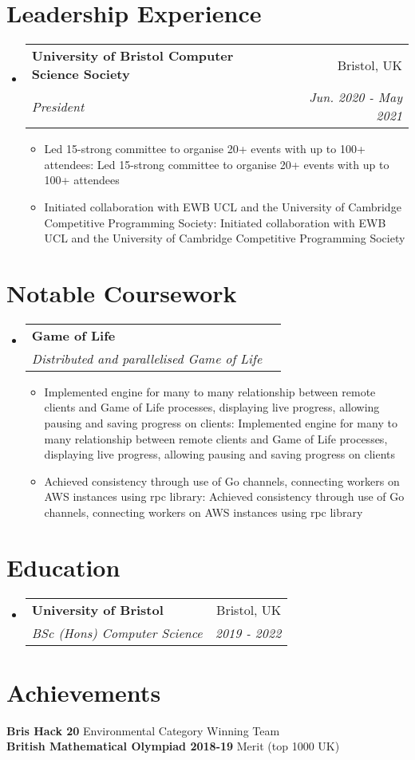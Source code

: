 \documentclass[a4paper,11pt]{article}
\makeatletter
\def \ifempty#1{\def\temp{#1} \ifx\temp\empty }
\newcommand{\resumeItem}[2]{
  \item\small{
  	\ifempty{#1}#2\else\textbf{#1}{: #2 \vspace{-2pt}}\fi
  }
}
\newcommand{\resumeSubheading}[4]{
  \vspace{-1pt}\item
    \begin{tabular*}{0.97\textwidth}{l@{\extracolsep{\fill}}r}
      \textbf{#1} & #2 \\
      \textit{\small#3} & \textit{\small #4} \\
    \end{tabular*}\vspace{-5pt}
}
\newcommand{\resumeSubHeadingListStart}{\begin{itemize}[leftmargin=*]}
\newcommand{\resumeSubHeadingListEnd}{\end{itemize}}
\newcommand{\resumeItemListStart}{\begin{itemize}}
\newcommand{\resumeItemListEnd}{\end{itemize}\vspace{-5pt}}
\makeatother
\begin{document}
\section{Leadership Experience}
  \resumeSubHeadingListStart
    \resumeSubheading
      {University of Bristol Computer Science Society}{Bristol, UK}
      {President}{Jun. 2020 - May 2021}
      \resumeItemListStart
        \resumeItem{}
          {Led 15-strong committee to organise 20+ events with up to 100+ attendees}
        \resumeItem{}
          {Initiated collaboration with EWB UCL and the University of Cambridge Competitive Programming Society}
      \resumeItemListEnd
  \resumeSubHeadingListEnd


\section{Notable Coursework}
  \resumeSubHeadingListStart
    \resumeSubheading
      {Game of Life}{}
      {Distributed and parallelised Game of Life}{}
      \resumeItemListStart
        \resumeItem{}
          {Implemented engine for many to many relationship between remote clients and Game of Life processes, displaying live progress, allowing pausing and saving progress on clients}
        \resumeItem{}
          {Achieved consistency through use of Go channels, connecting workers on AWS instances using rpc library}
      \resumeItemListEnd
  \resumeSubHeadingListEnd


\section{Education}
  \resumeSubHeadingListStart
    \resumeSubheading
      {University of Bristol}{Bristol, UK}
      {BSc (Hons) Computer Science}{2019 - 2022}
  \resumeSubHeadingListEnd


\section{Achievements}
  \textbf{Bris Hack 20}{ Environmental Category Winning Team} \\
  \textbf{British Mathematical Olympiad 2018-19}{ Merit (top 1000 UK)} \\
  
  
\end{document}
